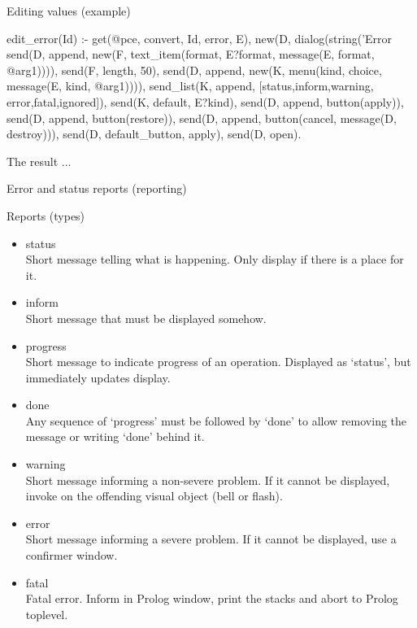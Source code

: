 \begin{sli}{Editing values (example)}
\begin{code}
edit_error(Id) :-
        get(@pce, convert, Id, error, E),
        new(D, dialog(string('Error %
        send(D, append,
             new(F, text_item(format, E?format,
                    message(E, format, @arg1)))),
        send(F, length, 50),
        send(D, append,
             new(K, menu(kind, choice,
                    message(E, kind, @arg1)))),
        send_list(K, append,
                  [status,inform,warning,
                   error,fatal,ignored]),
        send(K, default, E?kind),
        send(D, append, button(apply)),
        send(D, append, button(restore)),
        send(D, append, button(cancel,
                            message(D, destroy))),
        send(D, default_button, apply),
        send(D, open).
\end{code}

\noindent
\end{sli}


\begin{sli}{The result ...}


\end{sli}


\begin{sli}{Error and status reports (reporting)}


\end{sli}


\begin{sli}{Reports (types)}
\begin{itemize}
    \item status\hfill\\
    	  Short message telling what is happening.  Only display
	  if there is a place for it.
    \item inform\hfill\\
          Short message that must be displayed somehow.
    \item progress\hfill\\
          Short message to indicate progress of an operation.
	  Displayed as `status', but immediately updates display.
    \item done\hfill\\
          Any sequence of `progress' must be followed by `done'
	  to allow removing the message or writing `done' behind
	  it.
    \item warning\hfill\\
    	  Short message informing a non-severe problem.  If it
	  cannot be displayed, invoke  on the offending
	  visual object (bell or flash).
    \item error\hfill\\
    	  Short message informing a severe problem.  If it cannot
	  be displayed, use a confirmer window.
    \item fatal\hfill\\
	  Fatal error.  Inform in Prolog window, print the stacks
	  and abort to Prolog toplevel.
\end{itemize}
\end{sli}

